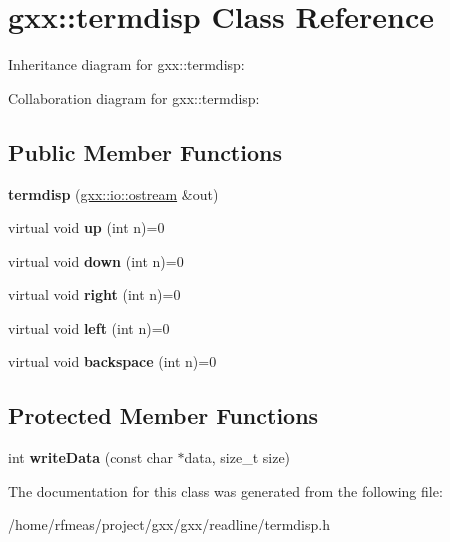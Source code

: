 \hypertarget{classgxx_1_1termdisp}{}\section{gxx\+:\+:termdisp Class Reference}
\label{classgxx_1_1termdisp}


Inheritance diagram for gxx\+:\+:termdisp\+:


Collaboration diagram for gxx\+:\+:termdisp\+:
\subsection*{Public Member Functions}
\begin{DoxyCompactItemize}
\item 
{\bfseries termdisp} (\hyperlink{classgxx_1_1io_1_1ostream}{gxx\+::io\+::ostream} \&out)\hypertarget{classgxx_1_1termdisp_aa0ce79b2a396c64583d7b50b79e05d2a}{}\label{classgxx_1_1termdisp_aa0ce79b2a396c64583d7b50b79e05d2a}

\item 
virtual void {\bfseries up} (int n)=0\hypertarget{classgxx_1_1termdisp_a27238c4b3b1d9bf12a3d859a389ae7ff}{}\label{classgxx_1_1termdisp_a27238c4b3b1d9bf12a3d859a389ae7ff}

\item 
virtual void {\bfseries down} (int n)=0\hypertarget{classgxx_1_1termdisp_aa1d4fccd0d493e1df0f1b6bd151ccd08}{}\label{classgxx_1_1termdisp_aa1d4fccd0d493e1df0f1b6bd151ccd08}

\item 
virtual void {\bfseries right} (int n)=0\hypertarget{classgxx_1_1termdisp_a68c782a16fdb3fe85818229dd4f8deba}{}\label{classgxx_1_1termdisp_a68c782a16fdb3fe85818229dd4f8deba}

\item 
virtual void {\bfseries left} (int n)=0\hypertarget{classgxx_1_1termdisp_ac66aafb35de9e8e7661d4dd607b025f4}{}\label{classgxx_1_1termdisp_ac66aafb35de9e8e7661d4dd607b025f4}

\item 
virtual void {\bfseries backspace} (int n)=0\hypertarget{classgxx_1_1termdisp_a5507ce22bffa0cea34f57575f97adc0b}{}\label{classgxx_1_1termdisp_a5507ce22bffa0cea34f57575f97adc0b}

\end{DoxyCompactItemize}
\subsection*{Protected Member Functions}
\begin{DoxyCompactItemize}
\item 
int {\bfseries write\+Data} (const char $\ast$data, size\+\_\+t size)\hypertarget{classgxx_1_1termdisp_a3ececc0539ea8d5d3f916563dc967317}{}\label{classgxx_1_1termdisp_a3ececc0539ea8d5d3f916563dc967317}

\end{DoxyCompactItemize}


The documentation for this class was generated from the following file\+:\begin{DoxyCompactItemize}
\item 
/home/rfmeas/project/gxx/gxx/readline/termdisp.\+h\end{DoxyCompactItemize}
